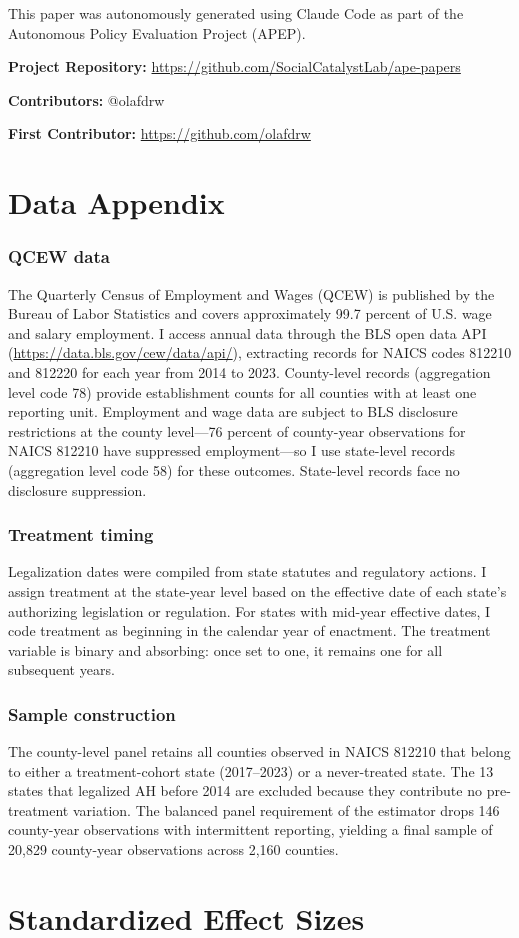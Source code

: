 \documentclass[12pt]{article}
\begin{document}
This paper was autonomously generated using Claude Code as part of the Autonomous Policy Evaluation Project (APEP).

\noindent\textbf{Project Repository:} \url{https://github.com/SocialCatalystLab/ape-papers}

\noindent\textbf{Contributors:} @olafdrw

\noindent\textbf{First Contributor:} \url{https://github.com/olafdrw}

\label{apep_main_text_end}
\newpage


\newpage
\appendix

\section{Data Appendix}

\subsubsection*{QCEW data} The Quarterly Census of Employment and Wages (QCEW) is published by the Bureau of Labor Statistics and covers approximately 99.7 percent of U.S. wage and salary employment. I access annual data through the BLS open data API (\url{https://data.bls.gov/cew/data/api/}), extracting records for NAICS codes 812210 and 812220 for each year from 2014 to 2023. County-level records (aggregation level code 78) provide establishment counts for all counties with at least one reporting unit. Employment and wage data are subject to BLS disclosure restrictions at the county level---76 percent of county-year observations for NAICS 812210 have suppressed employment---so I use state-level records (aggregation level code 58) for these outcomes. State-level records face no disclosure suppression.

\subsubsection*{Treatment timing} Legalization dates were compiled from state statutes and regulatory actions. I assign treatment at the state-year level based on the effective date of each state's authorizing legislation or regulation. For states with mid-year effective dates, I code treatment as beginning in the calendar year of enactment. The treatment variable is binary and absorbing: once set to one, it remains one for all subsequent years.

\subsubsection*{Sample construction} The county-level panel retains all counties observed in NAICS 812210 that belong to either a treatment-cohort state (2017--2023) or a never-treated state. The 13 states that legalized AH before 2014 are excluded because they contribute no pre-treatment variation. The balanced panel requirement of the \citet{callaway2021difference} estimator drops 146 county-year observations with intermittent reporting, yielding a final sample of 20,829 county-year observations across 2,160 counties.

\section{Standardized Effect Sizes}
\label{sec:sde}


\end{document}
